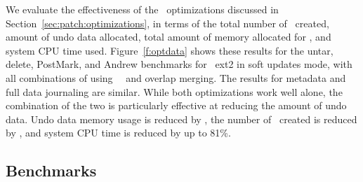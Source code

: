 \opttable{}

We evaluate the effectiveness of the \patch\ optimizations discussed in
Section~\ref{sec:patch:optimizations}, in terms of
%
the total number of \patches\ created, amount of undo data allocated,
total amount of memory allocated for \Kudos, and system CPU time used.
%
Figure~\ref{f:optdata} shows these results for the untar, delete,
PostMark, and Andrew benchmarks for \Kudos\ ext2 in soft updates mode,
with all combinations of using \nrb\ \patches\ and overlap merging.
The results for metadata and full data journaling are similar.
%
While both optimizations work well alone, the combination of the two
is particularly effective at reducing the amount of undo data.
%
Undo data memory usage is reduced by \patchoptundo,
%
the number of \patches\ created is reduced by \patchoptcount,
%
and system CPU time is reduced by up to 81\%.

\begin{comment}
\begin{figure}[t]
\vspace{-0.5\baselineskip}
\centering{
\texttt{[image: rb\_patch\_size]}
}
\vspace{-0.5\baselineskip}
\caption{\label{fig:patchsize-histo} \Rb\ \patch\ size histogram for a sample
workload (extracting a large archive into ext2). All the \patches\ larger than
63 bytes have been optimized into \nrb\ \patches. \Rb\ \patches\ 4 bytes and
smaller account for about 51\% of all \rb\ \patches.}
\end{figure}
\end{comment}

\subsection {Benchmarks}
\label{sec:eval:bench}

\newcommand{\safe}[1]{\textbf{#1}}
\newcommand{\unsafe}[1]{#1}

